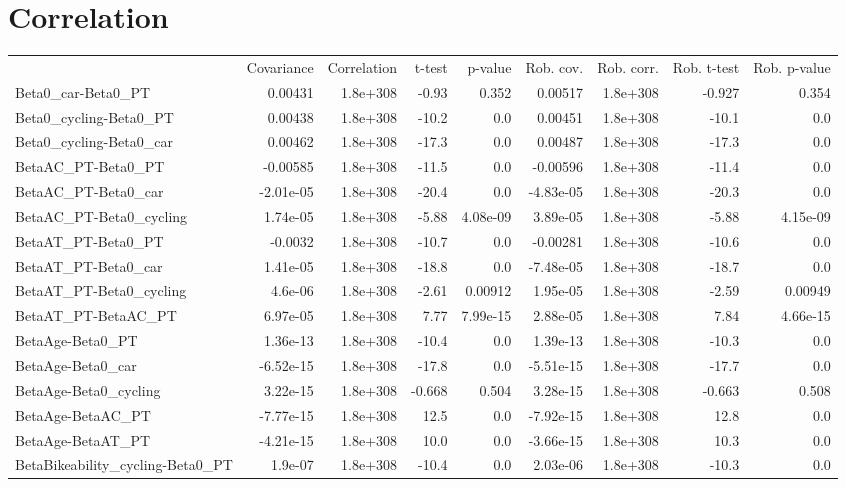 \section{Correlation}
\begin{tabular}{lrrrrrrrr}
 & Covariance & Correlation & t-test & p-value & Rob. cov. & Rob. corr. & Rob. t-test & Rob. p-value \\
Beta0_car-Beta0_PT & 0.00431 & 1.8e+308 & -0.93 & 0.352 & 0.00517 & 1.8e+308 & -0.927 & 0.354 \\
Beta0_cycling-Beta0_PT & 0.00438 & 1.8e+308 & -10.2 & 0.0 & 0.00451 & 1.8e+308 & -10.1 & 0.0 \\
Beta0_cycling-Beta0_car & 0.00462 & 1.8e+308 & -17.3 & 0.0 & 0.00487 & 1.8e+308 & -17.3 & 0.0 \\
BetaAC_PT-Beta0_PT & -0.00585 & 1.8e+308 & -11.5 & 0.0 & -0.00596 & 1.8e+308 & -11.4 & 0.0 \\
BetaAC_PT-Beta0_car & -2.01e-05 & 1.8e+308 & -20.4 & 0.0 & -4.83e-05 & 1.8e+308 & -20.3 & 0.0 \\
BetaAC_PT-Beta0_cycling & 1.74e-05 & 1.8e+308 & -5.88 & 4.08e-09 & 3.89e-05 & 1.8e+308 & -5.88 & 4.15e-09 \\
BetaAT_PT-Beta0_PT & -0.0032 & 1.8e+308 & -10.7 & 0.0 & -0.00281 & 1.8e+308 & -10.6 & 0.0 \\
BetaAT_PT-Beta0_car & 1.41e-05 & 1.8e+308 & -18.8 & 0.0 & -7.48e-05 & 1.8e+308 & -18.7 & 0.0 \\
BetaAT_PT-Beta0_cycling & 4.6e-06 & 1.8e+308 & -2.61 & 0.00912 & 1.95e-05 & 1.8e+308 & -2.59 & 0.00949 \\
BetaAT_PT-BetaAC_PT & 6.97e-05 & 1.8e+308 & 7.77 & 7.99e-15 & 2.88e-05 & 1.8e+308 & 7.84 & 4.66e-15 \\
BetaAge-Beta0_PT & 1.36e-13 & 1.8e+308 & -10.4 & 0.0 & 1.39e-13 & 1.8e+308 & -10.3 & 0.0 \\
BetaAge-Beta0_car & -6.52e-15 & 1.8e+308 & -17.8 & 0.0 & -5.51e-15 & 1.8e+308 & -17.7 & 0.0 \\
BetaAge-Beta0_cycling & 3.22e-15 & 1.8e+308 & -0.668 & 0.504 & 3.28e-15 & 1.8e+308 & -0.663 & 0.508 \\
BetaAge-BetaAC_PT & -7.77e-15 & 1.8e+308 & 12.5 & 0.0 & -7.92e-15 & 1.8e+308 & 12.8 & 0.0 \\
BetaAge-BetaAT_PT & -4.21e-15 & 1.8e+308 & 10.0 & 0.0 & -3.66e-15 & 1.8e+308 & 10.3 & 0.0 \\
BetaBikeability_cycling-Beta0_PT & 1.9e-07 & 1.8e+308 & -10.4 & 0.0 & 2.03e-06 & 1.8e+308 & -10.3 & 0.0 \\

\end{tabular}
